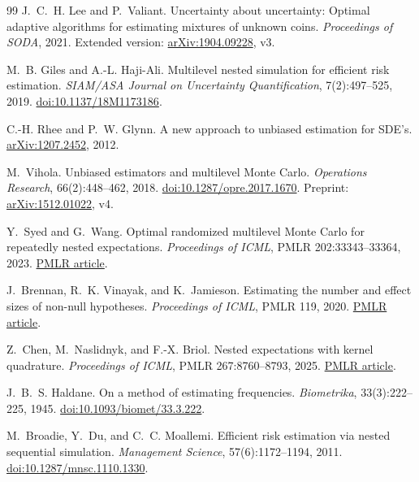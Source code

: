\documentclass[11pt,a4paper]{article}
\theoremstyle{definition}
\begin{document}
\begin{thebibliography}{99}
J.~C.~H. Lee and P.~Valiant.
\newblock Uncertainty about uncertainty: Optimal adaptive algorithms for
estimating mixtures of unknown coins.
\newblock \emph{Proceedings of SODA}, 2021.
\newblock Extended version: \href{https://arxiv.org/abs/1904.09228}{arXiv:1904.09228}, v3.

M.~B. Giles and A.-L. Haji-Ali.
\newblock Multilevel nested simulation for efficient risk estimation.
\newblock \emph{SIAM/ASA Journal on Uncertainty Quantification}, 7(2):497--525, 2019.
\newblock \href{https://doi.org/10.1137/18M1173186}{doi:10.1137/18M1173186}.

C.-H. Rhee and P.~W. Glynn.
\newblock A new approach to unbiased estimation for SDE's.
\newblock \href{https://arxiv.org/abs/1207.2452}{arXiv:1207.2452}, 2012.

M.~Vihola.
\newblock Unbiased estimators and multilevel Monte Carlo.
\newblock \emph{Operations Research}, 66(2):448--462, 2018.
\newblock \href{https://doi.org/10.1287/opre.2017.1670}{doi:10.1287/opre.2017.1670}.
\newblock Preprint: \href{https://arxiv.org/abs/1512.01022}{arXiv:1512.01022}, v4.

Y.~Syed and G.~Wang.
\newblock Optimal randomized multilevel Monte Carlo for repeatedly nested expectations.
\newblock \emph{Proceedings of ICML}, PMLR 202:33343--33364, 2023.
\newblock \href{https://proceedings.mlr.press/v202/syed23a.html}{PMLR article}.

J.~Brennan, R.~K. Vinayak, and K.~Jamieson.
\newblock Estimating the number and effect sizes of non-null hypotheses.
\newblock \emph{Proceedings of ICML}, PMLR 119, 2020.
\newblock \href{https://proceedings.mlr.press/v119/brennan20a.html}{PMLR article}.

Z.~Chen, M.~Naslidnyk, and F.-X. Briol.
\newblock Nested expectations with kernel quadrature.
\newblock \emph{Proceedings of ICML}, PMLR 267:8760--8793, 2025.
\newblock \href{https://proceedings.mlr.press/v267/chen25av.html}{PMLR article}.

J.~B.~S. Haldane.
\newblock On a method of estimating frequencies.
\newblock \emph{Biometrika}, 33(3):222--225, 1945.
\newblock \href{https://doi.org/10.1093/biomet/33.3.222}{doi:10.1093/biomet/33.3.222}.

M.~Broadie, Y.~Du, and C.~C. Moallemi.
\newblock Efficient risk estimation via nested sequential simulation.
\newblock \emph{Management Science}, 57(6):1172--1194, 2011.
\newblock \href{https://doi.org/10.1287/mnsc.1110.1330}{doi:10.1287/mnsc.1110.1330}.


\end{thebibliography}
\end{document}
